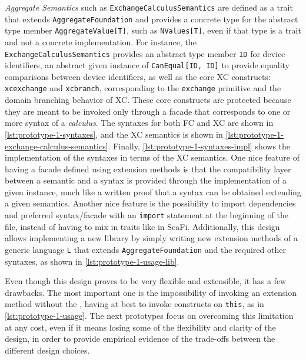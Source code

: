 \textit{Aggregate Semantics} such as \texttt{ExchangeCalculusSemantics} are defined as a trait that extends \texttt{AggregateFoundation} and provides a concrete type for the abstract type member \texttt{AggregateValue[T]}, such as \texttt{NValues[T]}, even if that type is a trait and not a concrete implementation.
%
For instance, the \texttt{ExchangeCalculusSemantics} provides an abstract type member \texttt{ID} for device identifiers, an abstract given instance of \texttt{CanEqual[ID, ID]} to provide equality comparisons between device identifiers, as well as the core \ac{XC} constructs: \texttt{xcexchange} and \texttt{xcbranch}, corresponding to the \texttt{exchange} primitive and the domain branching behavior of \ac{XC}.
%
These core constructs are protected because they are meant to be invoked only through a facade that corresponds to one or more syntax of a \textit{calculus}.
%
The syntaxes for both \ac{FC} and \ac{XC} are shown in \cref{lst:prototype-1-syntaxes}, and the \ac{XC} semantics is shown in \cref{lst:prototype-1-exchange-calculus-semantics}.
%
Finally, \cref{lst:prototype-1-syntaxes-impl} shows the implementation of the syntaxes in terms of the \ac{XC} semantics.
%
One nice feature of having a facade defined using extension methods is that the compatibility layer between a semantic and a syntax is provided through the implementation of a given instance, much like a written proof that a syntax can be obtained extending a given semantics.
%
Another nice feature is the possibility to import dependencies and preferred syntax/facade with an \texttt{import} statement at the beginning of the file, instead of having to mix in traits like in ScaFi.
%
Additionally, this design allows implementing a new library by simply writing new extension methods of a generic language \texttt{L} that extends \texttt{AggregateFoundation} and the required other syntaxes, as shown in \cref{lst:prototype-1-usage-lib}.





Even though this design proves to be very flexible and extensible, it has a few drawbacks.
%
The most important one is the impossibility of invoking an extension method without the , having at best to invoke constructs on \texttt{this}, as in \cref{lst:prototype-1-usage}.
%
The next prototypes focus on overcoming this limitation at any cost, even if it means losing some of the flexibility and clarity of the design, in order to provide empirical evidence of the trade-offs between the different design choices.

